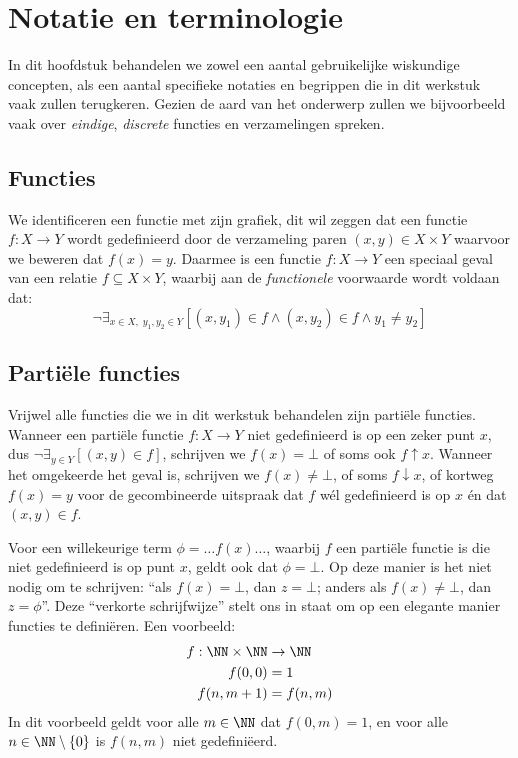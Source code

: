 \chapter{Notatie en terminologie}
\label{chp:notatie}

In dit hoofdstuk behandelen we zowel een aantal gebruikelijke wiskundige concepten, als een aantal specifieke notaties en begrippen die in dit werkstuk vaak zullen terugkeren. Gezien de aard van het onderwerp zullen we bijvoorbeeld vaak over \emph{eindige}, \emph{discrete} functies en verzamelingen spreken.

\section{Functies}
\label{sec:afbeeldingen}

We identificeren een functie met zijn grafiek, dit wil zeggen dat een functie $f : X \to Y$ wordt gedefinieerd door de verzameling paren $(x, y) \in X \times Y$ waarvoor we beweren dat $f(x) = y$. Daarmee is een functie $f : X \to Y$ een speciaal geval van een relatie $f \subseteq X \times Y$, waarbij aan de \emph{functionele} voorwaarde wordt voldaan dat:
%
\begin{equation*}
  \neg \exists_{x \in X,\; y_1,y_2 \in Y} \left[ (x, y_1) \in f \land (x, y_2) \in f \land y_1 \neq y_2 \right]
\end{equation*}

\section{Partiële functies}
\label{sec:partielefuncties}

Vrijwel alle functies die we in dit werkstuk behandelen zijn partiële functies. Wanneer een partiële functie $f : X \to Y$ niet gedefinieerd is op een zeker punt $x$, dus $\neg \exists_{y \in Y} [ (x, y) \in f ]$, schrijven we $f(x) = \bot$ of soms ook $f \uparrow x$. Wanneer het omgekeerde het geval is, schrijven we $f(x) \neq \bot$, of soms $f \downarrow x$, of kortweg $f(x) = y$ voor de gecombineerde uitspraak dat $f$ wél gedefinieerd is op $x$ én dat $(x, y) \in f$.

Voor een willekeurige term $\phi = \dots f(x)\dots$, waarbij $f$ een partiële functie is die niet gedefinieerd is op punt $x$, geldt ook dat $\phi = \bot$. Op deze manier is het niet nodig om te schrijven: “als $f(x) = \bot$, dan $z = \bot$; anders als $f(x) \neq \bot$, dan $z = \phi$”. Deze “verkorte schrijfwijze” stelt ons in staat om op een elegante manier functies te definiëren. Een voorbeeld:
\begin{align*}
  f : \NN \times \NN &\to \NN \\
  f(0, 0) &= 1 \\
  f(n, m + 1) &= f(n, m)
\end{align*}
In dit voorbeeld geldt voor alle $m \in \NN$ dat $f(0, m) = 1$, en voor alle $n \in \NN \setminus \{0\}$ is $f(n, m)$ niet gedefiniëerd.

